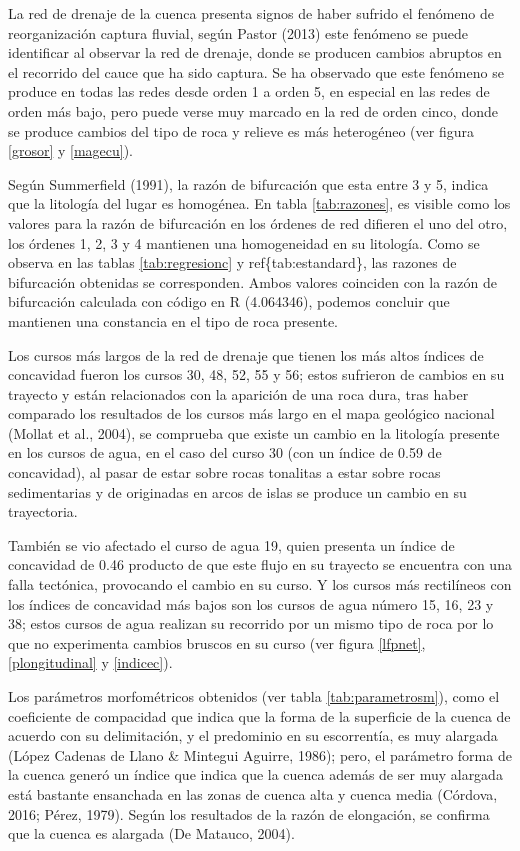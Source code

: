 \documentclass[11pt,]{article}
\begin{document}
La red de drenaje de la cuenca presenta signos de haber sufrido el
fenómeno de reorganización captura fluvial, según Pastor (2013) este
fenómeno se puede identificar al observar la red de drenaje, donde se
producen cambios abruptos en el recorrido del cauce que ha sido captura.
Se ha observado que este fenómeno se produce en todas las redes desde
orden 1 a orden 5, en especial en las redes de orden más bajo, pero
puede verse muy marcado en la red de orden cinco, donde se produce
cambios del tipo de roca y relieve es más heterogéneo (ver figura
\ref{grosor} y \ref{magecu}).

Según Summerfield (1991), la razón de bifurcación que esta entre 3 y 5,
indica que la litología del lugar es homogénea. En tabla
\ref{tab:razones}, es visible como los valores para la razón de
bifurcación en los órdenes de red difieren el uno del otro, los órdenes
1, 2, 3 y 4 mantienen una homogeneidad en su litología. Como se observa
en las tablas \ref{tab:regresionc} y ref\{tab:estandard\}, las razones
de bifurcación obtenidas se corresponden. Ambos valores coinciden con la
razón de bifurcación calculada con código en R (4.064346), podemos
concluir que mantienen una constancia en el tipo de roca presente.

Los cursos más largos de la red de drenaje que tienen los más altos
índices de concavidad fueron los cursos 30, 48, 52, 55 y 56; estos
sufrieron de cambios en su trayecto y están relacionados con la
aparición de una roca dura, tras haber comparado los resultados de los
cursos más largo en el mapa geológico nacional (Mollat et al., 2004), se
comprueba que existe un cambio en la litología presente en los cursos de
agua, en el caso del curso 30 (con un índice de 0.59 de concavidad), al
pasar de estar sobre rocas tonalitas a estar sobre rocas sedimentarias y
de originadas en arcos de islas se produce un cambio en su trayectoria.

También se vio afectado el curso de agua 19, quien presenta un índice de
concavidad de 0.46 producto de que este flujo en su trayecto se
encuentra con una falla tectónica, provocando el cambio en su curso. Y
los cursos más rectilíneos con los índices de concavidad más bajos son
los cursos de agua número 15, 16, 23 y 38; estos cursos de agua realizan
su recorrido por un mismo tipo de roca por lo que no experimenta cambios
bruscos en su curso (ver figura \ref{lfpnet}, \ref{plongitudinal} y
\ref{indicec}).

Los parámetros morfométricos obtenidos (ver tabla
\ref{tab:parametrosm}), como el coeficiente de compacidad que indica que
la forma de la superficie de la cuenca de acuerdo con su delimitación, y
el predominio en su escorrentía, es muy alargada (López Cadenas de Llano
\& Mintegui Aguirre, 1986); pero, el parámetro forma de la cuenca generó
un índice que indica que la cuenca además de ser muy alargada está
bastante ensanchada en las zonas de cuenca alta y cuenca media (Córdova,
2016; Pérez, 1979). Según los resultados de la razón de elongación, se
confirma que la cuenca es alargada (De Matauco, 2004).
\end{document}
